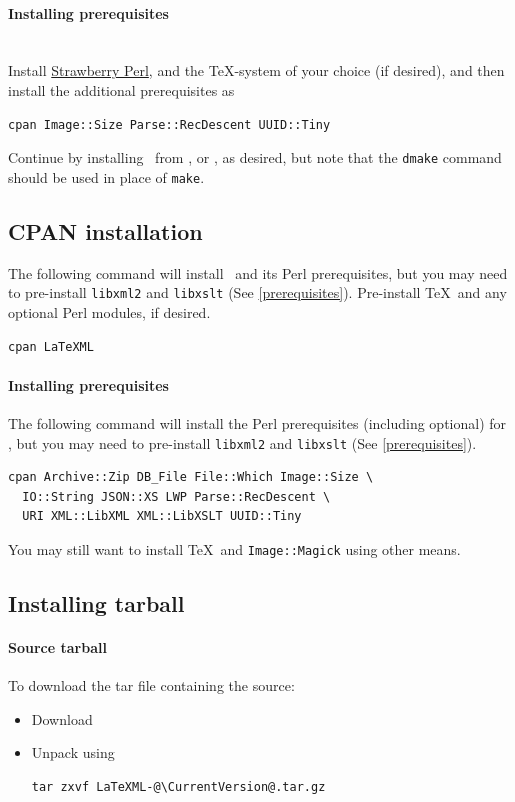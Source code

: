 \documentclass{article}
\begin{document}
\paragraph{Installing prerequisites}\label{install.windows.prereq}\\
Install \href{http://strawberryperl.com}{Strawberry Perl}, and
the \TeX-system of your choice (if desired), and then install the 
additional prerequisites as
\begin{lstlisting}[style=shell]
cpan Image::Size Parse::RecDescent UUID::Tiny
\end{lstlisting}
Continue by installing \LaTeXML\ from
, 
or , as desired,
but note that the \texttt{dmake} command should be used in place of \texttt{make}.

\subsection{CPAN installation}\label{install.cpan}
The following command will install \LaTeXML\ and its Perl prerequisites,
but you may need to pre-install \texttt{libxml2} and  \texttt{libxslt} (See \ref{prerequisites}).
Pre-install \TeX\ and any optional Perl modules, if desired.
\begin{lstlisting}[style=shell]
cpan LaTeXML
\end{lstlisting}

\paragraph{Installing prerequisites}\label{install.cpan.prereq}
The following command will install the Perl prerequisites (including optional)
for \LaTeXML, but you may need to pre-install \texttt{libxml2} and  \texttt{libxslt} (See \ref{prerequisites}).
\begin{lstlisting}[style=shell]
cpan Archive::Zip DB_File File::Which Image::Size \
  IO::String JSON::XS LWP Parse::RecDescent \
  URI XML::LibXML XML::LibXSLT UUID::Tiny
\end{lstlisting}
You may still want to install \TeX\ and \texttt{Image::Magick}
using other means.

\subsection{Installing tarball}\label{install.tarball}
\paragraph{Source tarball}\label{source.tarball}
To download the tar file containing the source:
\begin{itemize}
\item Download \CurrentTarball
\item Unpack using
\begin{lstlisting}[style=shell]
tar zxvf LaTeXML-@\CurrentVersion@.tar.gz
\end{lstlisting}
\end{itemize}
\end{document}
